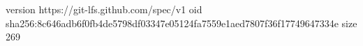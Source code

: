 version https://git-lfs.github.com/spec/v1
oid sha256:8c646adb6f0fb4de5798df03347e05124fa7559e1aed7807f36f17749647334e
size 269

